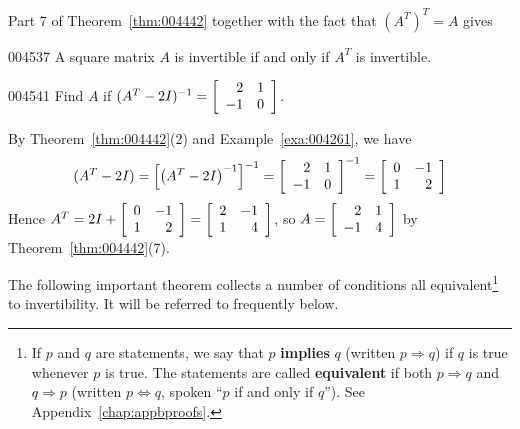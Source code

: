 Part 7 of Theorem~\ref{thm:004442} together with the fact that $(A^{T})^{T} = A$ gives


\begin{corollary}{}{004537}
A square matrix $A$ is invertible if and only if $A^{T}$ is invertible.
\end{corollary}

\begin{example}{}{004541}
Find $A$ if $(A^{T} - 2I)^{-1} = \left[ \begin{array}{rr}
2 & 1 \\
-1 & 0
\end{array} \right]$.

\begin{solution}
  By Theorem~\ref{thm:004442}(2) and Example~\ref{exa:004261}, we have
\begin{equation*}
(A^{T} - 2I) = \left[ \left(A^{T} - 2I\right)^{-1} \right]^{-1} = \left[ \begin{array}{rr}
2 & 1 \\
-1 & 0
\end{array} \right]^{-1} = \left[ \begin{array}{rr}
0 & -1 \\
1 & 2
\end{array} \right]
\end{equation*}
Hence $A^{T} = 2I + \left[ \begin{array}{rr}
0 & -1 \\
1 & 2
\end{array} \right] = \left[ \begin{array}{rr}
2 & -1 \\
1 & 4
\end{array} \right]$, so $A = \left[ \begin{array}{rr}
 2 & 1 \\
 -1 & 4
 \end{array} \right]$
 by Theorem~\ref{thm:004442}(7).
\end{solution}
\end{example}

The following important theorem collects a number of conditions all equivalent\footnote{If $p$ and $q$ are statements, we say that $p$ \textbf{implies} $q$ (written $p \Rightarrow q$) if $q$ is true whenever $p$ is true. The statements are called \textbf{equivalent} if both $p \Rightarrow q$ and $q \Rightarrow p$ (written $p \Leftrightarrow q$, spoken ``$p$ if and only if $q$''). See Appendix~\ref{chap:appbproofs}.} to invertibility. It will be referred to frequently below.


